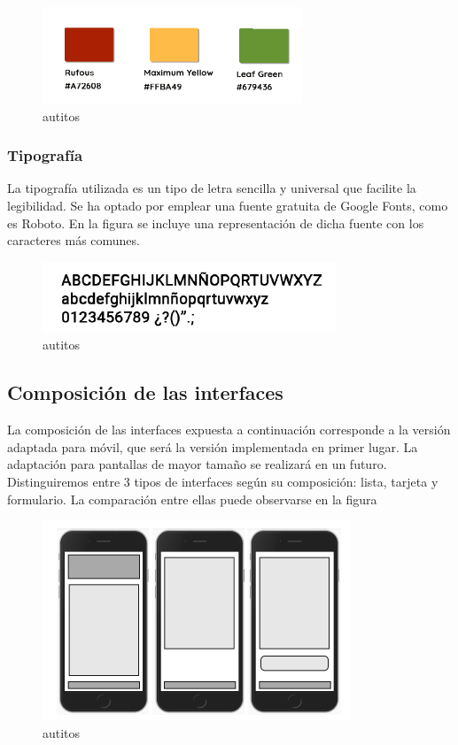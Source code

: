 \begin{figure}[H]
    \centering
    \includegraphics[scale=0.5]{figures/i8.png}
    \caption{autitos}
    \label{fig:i8}
\end{figure}

\subsubsection{Tipografía}

La tipografía utilizada es un tipo de letra sencilla y universal que facilite la legibilidad. Se ha optado por emplear una fuente gratuita de Google Fonts, como es Roboto. En la figura se incluye una representación de dicha fuente con los caracteres más comunes.

\begin{figure}[H]
    \centering
    \includegraphics[scale=0.5]{figures/i10.png}
    \caption{autitos}
    \label{fig:i10}
\end{figure}

\subsection{Composición de las interfaces}

La composición de las interfaces expuesta a continuación corresponde a la versión adaptada para móvil, que será la versión implementada en primer lugar. La adaptación para pantallas de mayor tamaño se realizará en un futuro.
Distinguiremos entre 3 tipos de interfaces según su composición: lista, tarjeta y formulario. La comparación entre ellas puede observarse en la figura 

\begin{figure}[H]
    \centering
    \includegraphics[scale=0.5]{figures/i7.png}
    \caption{autitos}
    \label{fig:i7}
\end{figure}

